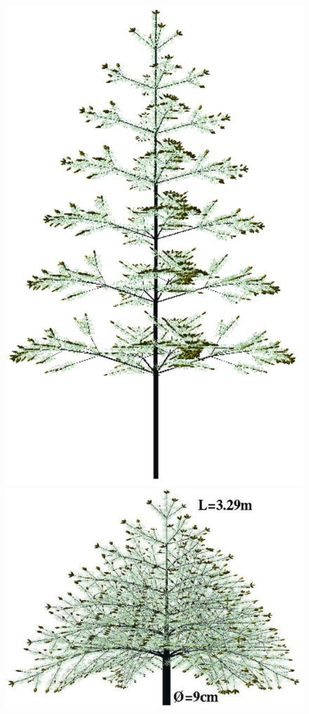 \begin{figure}
\includegraphics[scale=0.25]{pine8L}
\includegraphics[scale=0.25]{pine8q02h329cmd9cm}

\end{figure}
